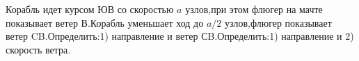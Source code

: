 Корабль идет курсом ЮВ со скоростью $a$ узлов,при этом флюгер на мачте показывает ветер В.Корабль уменьшает ход до $a/2$ узлов,флюгер показывает ветер CB.Определить:1) направление и 
ветер СB.Определить:1) направление  и 2) скорость  ветра.
